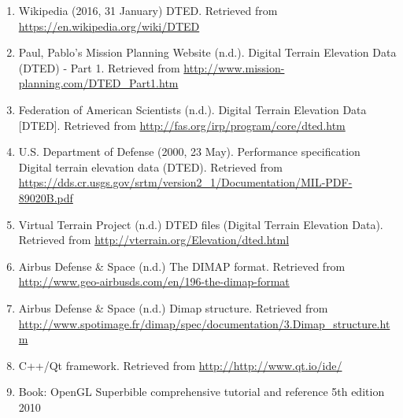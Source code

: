 \documentclass[11pt]{article}
\begin{document}
\begin{enumerate}[{(1)}]
\item Wikipedia (2016, 31 January) DTED. Retrieved from \url{https://en.wikipedia.org/wiki/DTED}

\item Paul, Pablo's Mission Planning Website (n.d.). Digital Terrain Elevation Data (DTED) - Part 1. Retrieved from \url{http://www.mission-planning.com/DTED_Part1.htm}

\item Federation of American Scientists (n.d.). Digital Terrain Elevation Data [DTED]. Retrieved from \url{http://fas.org/irp/program/core/dted.htm}
 
\item U.S. Department of Defense (2000, 23 May). Performance specification Digital terrain elevation data (DTED). Retrieved from \url{https://dds.cr.usgs.gov/srtm/version2_1/Documentation/MIL-PDF-89020B.pdf}

\item Virtual Terrain Project (n.d.) DTED files (Digital Terrain Elevation Data). Retrieved from \url{http://vterrain.org/Elevation/dted.html}


\item Airbus Defense \& Space (n.d.) The DIMAP format. Retrieved from \url{http://www.geo-airbusds.com/en/196-the-dimap-format}

\item Airbus Defense \& Space (n.d.) Dimap structure. Retrieved from \url{http://www.spotimage.fr/dimap/spec/documentation/3.Dimap_structure.htm}

\item C++/Qt framework. Retrieved from \url{http://http://www.qt.io/ide/}

\item Book: OpenGL Superbible comprehensive tutorial and reference 5th edition 2010
\end{enumerate}
\end{document}
